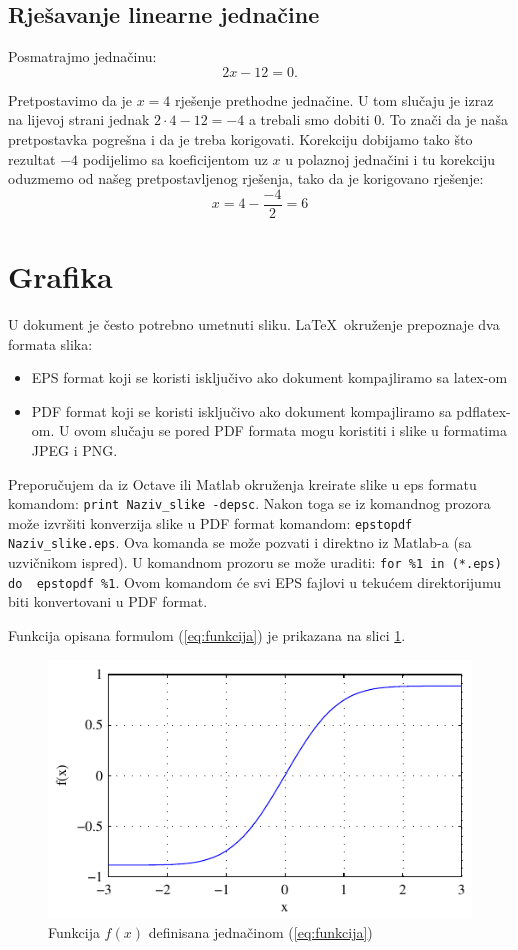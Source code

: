 \documentclass[12pt]{SeminarskiADS}
\begin{document}
\subsection{Rješavanje linearne jednačine}
Posmatrajmo jednačinu:
$$ 2x-12=0. $$

Pretpostavimo da je $x=4$ rješenje prethodne jednačine.
U tom slučaju je izraz na lijevoj strani jednak $2\cdot 4 -12=-4$ a trebali smo dobiti $0$. To znači da je naša pretpostavka pogrešna i da je treba korigovati. Korekciju dobijamo tako što rezultat $-4$ podijelimo sa koeficijentom uz $x$ u polaznoj jednačini i tu korekciju oduzmemo od našeg pretpostavljenog rješenja, tako da je korigovano rješenje:
$$ x=4-\frac{-4}{2}=6 $$

\section{Grafika}
\label{sec:grafika}

U dokument je često potrebno umetnuti sliku. \LaTeX\ okruženje prepoznaje dva formata slika:
\begin{itemize}
\item EPS format koji se koristi isključivo ako dokument kompajliramo sa latex-om
\item PDF format koji se koristi isključivo ako dokument kompajliramo sa pdflatex-om. U ovom slučaju se pored PDF formata mogu koristiti i slike u formatima JPEG i PNG.
\end{itemize}
Preporučujem da iz Octave ili Matlab okruženja kreirate slike u eps formatu komandom: \verb|print Naziv_slike -depsc|. 
Nakon toga se iz komandnog prozora može izvršiti konverzija slike u PDF format komandom: \verb|epstopdf Naziv_slike.eps|. Ova komanda se može pozvati i direktno iz Matlab-a (sa uzvičnikom ispred).
U komandnom prozoru se može uraditi: \verb|for %1 in (*.eps) do  epstopdf %1|. Ovom komandom će svi EPS fajlovi u tekućem direktorijumu biti konvertovani u PDF format.

Funkcija opisana formulom (\ref{eq:funkcija}) je prikazana na slici \ref{Slika1}.

\begin{figure}[tbp]
\centering
\includegraphics{Slika1}
\caption{Funkcija $f(x)$ definisana jednačinom (\ref{eq:funkcija})}
\label{Slika1}
\end{figure}
\end{document}
